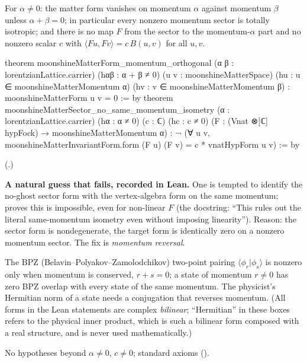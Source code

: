 \begin{theorem}\label{ch18:thm:nosame}
For $\alpha\neq0$: the matter form vanishes on momentum $\alpha$ against momentum $\beta$ unless $\alpha+\beta=0$; in particular
every nonzero momentum sector is totally isotropic; and there is no map $F$ from the sector to the momentum-$\alpha$
part and no nonzero scalar $c$ with $\langle Fu,Fv\rangle=c\,B(u,v)$ for all $u,v$.
\end{theorem}
\begin{leancode}
theorem moonshineMatterForm_momentum_orthogonal (α β : lorentzianLattice.carrier)
    (hαβ : α + β ≠ 0) (u v : moonshineMatterSpace)
    (hu : u ∈ moonshineMatterMomentum α) (hv : v ∈ moonshineMatterMomentum β) :
    moonshineMatterForm u v = 0 := by
theorem moonshineMatterSector_no_same_momentum_isometry (α : lorentzianLattice.carrier)
    (hα : α ≠ 0) (c : ℂ) (hc : c ≠ 0)
    (F : (Vnat ⊗[ℂ] hypFock) → moonshineMatterMomentum α) :
    ¬ (∀ u v, moonshineMatterInvariantForm.form (F u) (F v) = c * vnatHypForm u v) := by
\end{leancode}
(.)
\begin{warning}
\textbf{A natural guess that fails, recorded in Lean.}  One is tempted to identify the no-ghost sector form with the
vertex-algebra form on the same momentum;  proves this is
impossible, even for non-linear $F$ (the docstring: ``This rules out the literal same-momentum isometry even
without imposing linearity'').  Reason: the sector form is nondegenerate, the target form is identically zero
on a nonzero momentum sector.  The fix is \emph{momentum reversal}.
\end{warning}
\begin{physics}
The BPZ (Belavin--Polyakov--Zamolodchikov) two-point pairing $\langle\phi_r|\phi_s\rangle$ is nonzero only when momentum is conserved, $r+s=0$; a state of momentum
$r\neq0$ has zero BPZ overlap with every state of the same momentum.  The physicist's Hermitian norm of a state needs a
conjugation that reverses momentum.  (All forms in the Lean statements are complex \emph{bilinear}; ``Hermitian'' in these
boxes refers to the physical inner product, which is such a bilinear form composed with a real structure, and is never
used mathematically.)
\end{physics}
\begin{status}No hypotheses beyond $\alpha\neq0$, $c\neq0$; standard axioms ().\end{status}

